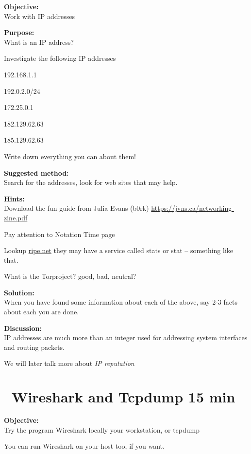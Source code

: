 \documentclass[a4paper,11pt,notitlepage]{report}
\begin{document}
{\bf Objective:}\\
Work with IP addresses

{\bf Purpose:}\\
What is an IP address?

Investigate the following IP addresses
\begin{list2}
\item 192.168.1.1
\item 192.0.2.0/24
\item 172.25.0.1
\item 182.129.62.63
\item 185.129.62.63
\end{list2}

Write down everything you can about them!

{\bf Suggested method:}\\
Search for the addresses, look for web sites that may help.

{\bf Hints:}\\
Download the fun guide from Julia Evans (b0rk) \url{https://jvns.ca/networking-zine.pdf}

Pay attention to Notation Time page

Lookup \url{ripe.net} they may have a service called stats or stat -- something like that.

What is the Torproject? good, bad, neutral?

{\bf Solution:}\\
When you have found some information about each of the above, say 2-3 facts about each you are done.

{\bf Discussion:}\\
IP addresses are much more than an integer used for addressing system interfaces and routing packets.

We will later talk more about \emph{IP reputation}






\chapter{\faInfoCircle\ Wireshark and Tcpdump 15 min}
\label{ex:wireshark-install}



{\bf Objective:}\\
Try the program Wireshark locally your workstation, or tcpdump

You can run Wireshark on your host too, if you want.
\end{document}
